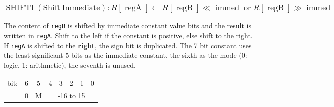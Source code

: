 \documentclass[10pt,a4paper]{article}
\theoremstyle{definition}%
\newcommand{\on}[1]{\operatorname{#1}}
\newcommand{\reg}[1]{\texttt{reg#1}}
\begin{document}
\subsubsection{$\on{SHIFTI} \on{(Shift ~Immediate)} : R\left[ \on{regA} \right] \longleftarrow    R\left[ \on{regB} \right] \ll \on{immed} \on{or}  R\left[ \on{regB} \right] \gg \on{immed} $}
The content of \reg{B} is shifted by immediate constant value bits and the result is written in \reg{A}.
Shift to the left if the constant is positive, else shift to the right.
If \reg{A} is shifted to the \textbf{right}, the sign bit is duplicated.
The 7 bit constant uses the least significant 5 bits as the immediate constant, the sixth as the mode (0: logic, 1: arithmetic), the seventh is unused.

\begin{center}
\begin{tabular}{c|c|c|ccccc}
	\toprule
	 	  bit: & 6 & 5 & 4 & 3 & 2 & 1 & 0  \\
	 	  \cmidrule{2-8}
	 			& 	0	&M	& \multicolumn{5}{c}{-16 to 15} \\
	 		\bottomrule
 \end{tabular} \\
\end{center}
\end{document}
